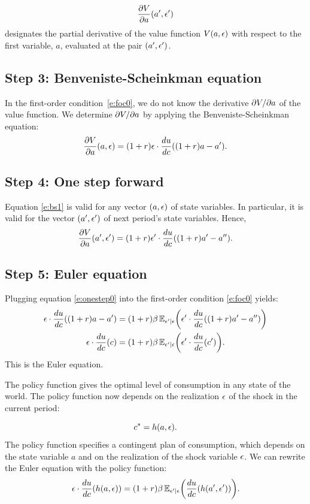 \documentclass[letterpaper, 11pt, leqno]{article}
\begin{document}
\begin{equation*}
\pd{V}{a}(a',\e')
\end{equation*}
designates the partial derivative of the value function $V(a,\epsilon)$ with respect to the first variable, $a$, evaluated at the pair $(a',\epsilon')$.

\subsection{Step 3: Benveniste-Scheinkman equation}

In the first-order condition~\eqref{e:foc0}, we do not know the derivative $\pdx{V}{a}$ of the value function. We determine $\pdx{V}{a}$ by applying the Benveniste-Scheinkman equation:
\begin{equation}
\pd{V}{a}(a,\e)= (1+r) \e \cdot \od{u}{c}((1+r) a-a').
\label{e:bs1}\end{equation}
\subsection{Step 4: One step forward}
Equation \eqref{e:bs1} is valid for any vector $(a,\epsilon)$ of state variables. In particular, it is valid for the vector $(a',\epsilon')$ of next period's state variables. Hence,
\begin{equation}
\pd{V}{a}(a',\e')= (1+r) \e'\cdot \od{u}{c}((1+r) a'-a'').
\label{e:onestep0}\end{equation}

\subsection{Step 5: Euler equation}

Plugging equation \eqref{e:onestep0} into the first-order condition \eqref{e:foc0} yields:
\begin{align}
\e \cdot \od{u}{c}((1+r) a-a')&=(1+r) \b \E[\e'\mid \e]{\e' \cdot \od{u}{c}((1+r) a'-a'')}\nonumber\\
\e \cdot \od{u}{c}(c)&=(1+r) \b \E[\e'\mid \e]{\e' \cdot \od{u}{c}(c')}.\label{e:eulerstoc}
\end{align}
This is the Euler equation.

The policy function gives the optimal level of consumption in any state of the world. The policy function now depends on the realization $\epsilon$ of the shock in the current period:

\begin{equation*}
c^{*}=h(a,\epsilon).
\end{equation*}
The policy function specifies a contingent plan of consumption, which depends on the state variable $a$ and on the realization of the shock variable $\epsilon$. We can rewrite the Euler equation with the policy function:
\begin{equation*}
\e \cdot \od{u}{c}(h(a,\e))=(1+r) \b \E[\e' \mid \e]{\od{u}{c}(h(a',\e'))}.
\end{equation*}
\end{document}
